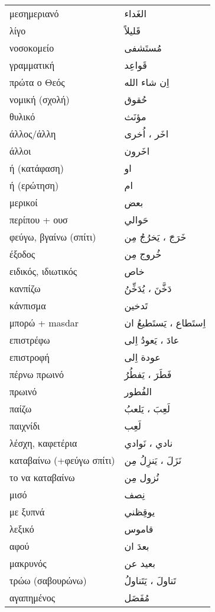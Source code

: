 \documentclass[twocolumn,a4paper]{article}
\newcommand{\ar}[1]{\textarabic{#1}}
\newcommand{\pl}{\raisebox{0.15ex}{\footnotesize ◍}}
\newcommand{\vrf}{\raisebox{0.15ex}{\footnotesize ◉}}
\newcommand{\vr}{\raisebox{0.15ex}{\footnotesize ◎}}
\newcommand{\mas}{\raisebox{0.15ex}{\footnotesize ◫}}
\begin{document}
\begin{mpsupertabular}{ P{0.5\textwidth} P{0.5\textwidth} }
μεσημεριανό    & \ar{ الغَداء } \\
λίγο           & \ar{ قَليلاً } \\
νοσοκομείο     & \ar{ مُستَشفى } \\
γραμματική     & \ar{ قَواعِد } \\
πρώτα ο Θεός   & \ar{ اِن شاء الله } \\
νομική (σχολή) & \ar{ حُقوق } \\
θυλικό         & \ar{ مؤنَث } \\

άλλος/άλλη     & \ar{ اخَر ، اُخرى  } \\
άλλοι          & \ar{ اخَرون } \\
ή (κατάφαση)   & \ar{ او } \\
ή (ερώτηση)    & \ar{ ام } \\
μερικοί        & \ar{ بعض } \\
περίπου + ουσ  & \ar{ حَوالي } \\
φεύγω, βγαίνω (σπίτι) \vrf & \ar{ خَرَجَ ، يَخرُجُ مِن } \\
έξοδος \mas    & \ar{ خُروج مِن } \\
ειδικός, ιδιωτικός & \ar{ خاص } \\
κανπίζω \vrf   & \ar{ دَخَّنَ ، يُدَخِّنُ } \\ %
κάνπισμα \mas  & \ar{ تَدخين } \\
μπορώ + masdar \vrf & \ar{ اِستَطاع ، يَستَطيعُ ان } \\
επιστρέφω \vrf & \ar{ عادَ ، يَعودُ اِلى } \\
επιστροφή \mas & \ar{ عودة اِلى } \\
πέρνω πρωινό \vrf  & \ar{ فَطَرَ ، يَفطُرُ } \\
πρωινό \mas    & \ar{ الفُطور } \\
παίζω \vrf     & \ar{ لَعِبَ ، يَلعبُ } \\
παιχνίδι  \mas & \ar{ لَعِب } \\
λέσχη, καφετέρια \pl & \ar{ نادي ، نَوادي } \\
καταβαίνω (+φεύγω σπίτι) \vrf & \ar{ نَزَلَ ، يَنزِلُ مِن } \\
το να καταβαίνω \mas & \ar{ نُزول مِن } \\
μισό           & \ar{ نِصف } \\
με ξυπνά \vr   & \ar{ يوقِظني } \\
λεξικό         & \ar{ قاموس } \\
αφού           & \ar{ بعدَ ان } \\
μακρυνός       & \ar{ بعيد عن } \\
τρώω (σαβουρώνω) \vrf & \ar{ تَناولَ ، يَتَناولُ } \\
αγαπημένος     & \ar{ مُفَضَل } \\


\end{mpsupertabular}
\end{document}
